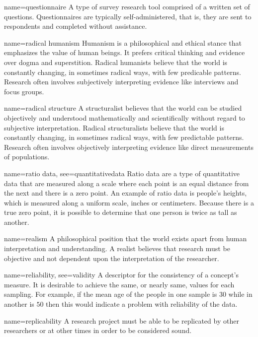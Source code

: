 {name={questionnaire}}
{%
	A type of survey research tool comprised of a written set of questions. Questionnaires are typically self-administered, that is, they are sent to respondents and completed without assistance.
}

{name={radical humanism}}
{%
	Humanism is a philosophical and ethical stance that emphasizes the value of human beings. It prefers critical thinking and evidence over dogma and superstition. Radical humanists believe that the world is constantly changing, in sometimes radical ways, with few predicable patterns. Research often involves subjectively interpreting evidence like interviews and focus groups.
}

{name={radical structure}}
{%
	A structuralist believes that the world can be studied objectively and understood mathematically and scientifically without regard to subjective interpretation. Radical structuralists believe that the world is constantly changing, in sometimes radical ways, with few predictable patterns. Research often involves objectively interpreting evidence like direct measurements of populations.
}

{name={ratio data},
	see={quantitativedata}}
{%
	Ratio data are a type of quantitative data that are measured along a scale where each point is an equal distance from the next and there is a zero point. An example of ratio data is people's heights, which is measured along a uniform scale, \eg inches or centimeters. Because there is a true zero point, it is possible to determine that one person is twice as tall as another.
}

{name={realism}}
{%
	A philosophical position that the world exists apart from human interpretation and understanding. A realist believes that research must be objective and not dependent upon the interpretation of the researcher.
}

	{name={reliability},
	 see={validity}}
	{%
		A descriptor for the consistency of a concept's measure. It is desirable to achieve the same, or nearly same, values for each sampling. For example, if the mean age of the people in one sample is $ 30 $ while in another is $ 50 $ then this would indicate a problem with reliability of the data.
	}

{name={replicability}}
{%
	A research project must be able to be replicated by other researchers or at other times in order to be considered sound.
}

